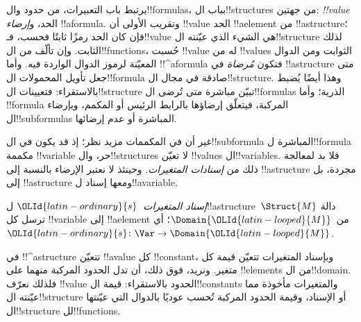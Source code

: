 \documentclass[../../../include/open-logic-section]{subfiles}
\begin{document}


\begin{explain}
يرتبط باب التعبيرات، من حدود وال!!{formula}s، بباب
ال!!{structure}s من جهتين: \emph{!!{value}} الحد، و\emph{إرضاء}
!!a{formula}. وتقريب الأولى أن !!{value} الحد !!a{element} من
!!a{structure}؛ فإن كان الحد رمزًا ثابتًا فحسب، فـ!!{value} هي الشيء
الذي عيّنته ال!!{structure} لذلك الثابت. وإن تألّف من
ال!!{function}s، حُسبت !!{value} له من !!{value}s الثوابت ومن
الدوال المعيّنة لرموز الدوال الواردة فيه. وأما !!^a{formula} فتكون
\emph{مُرضاة} في !!a{structure} متى جعل تأويل المحمولات
ال!!{formula} صادقة في مجال ال!!{structure}. وهذا أيضًا يُضبط
بالاستقراء: فتعيينات ال!!{structure} تبيّن مباشرة متى تُرضى
ال!!{formula}s الذرية؛ وأما !!{formula} المركبة، فيتعلّق إرضاؤها
بالرابط الرئيس أو المكمم، وبإرضاء ال!!{subformula}s المباشرة أو
عدم إرضائها.

غير أن في المكممات مزيد نظر؛ إذ قد يكون في ال!!{subformula}
المباشرة ل!!{formula} مكممة !!{variable} حر، وال!!{structure}s
لا تعيّن !!{value}s ال!!{variable}s. فلا بد لمعالجة ذلك من
\emph{إسنادات المتغيرات}. وحينئذ لا نعتبر الإرضاء بالنسبة إلى
!!a{structure} مجردة، بل إلى !!a{structure} ومعها إسناد
ل!!a{variable}.
\end{explain}

\begin{defn}
\emph{إسناد المتغيرات}~${\OLId{latin-ordinary}{s}}$ ل!!a{structure}~$\Struct{M}$ دالة ترسل
كل !!{variable} إلى !!a{element} من~$\Domain {\OLId{latin-looped}{M}}$؛ أي
${\OLId{latin-ordinary}{s}}\colon \Var \to \Domain {\OLId{latin-looped}{M}}$.
\end{defn}

\begin{explain}
في !!^a{structure} تتعيّن !!a{value} كل !!{constant}، وبإسناد
المتغيرات تتعيّن قيمة كل متغير. ونريد، فوق ذلك، أن تدل الحدود
المركبة منهما على !!{element}s من ال!!{domain}. فلذلك نعرّف
!!{value} الحدود بالاستقراء: قيمة ال!!{constant}s والمتغيرات
مأخوذة مما عيّنته ال!!{structure} أو الإسناد، وقيمة الحدود
المركبة تُحسب عوديًا بالدوال التي عيّنتها ال!!{structure}
لل!!{function}s.
\end{explain}
\end{document}
